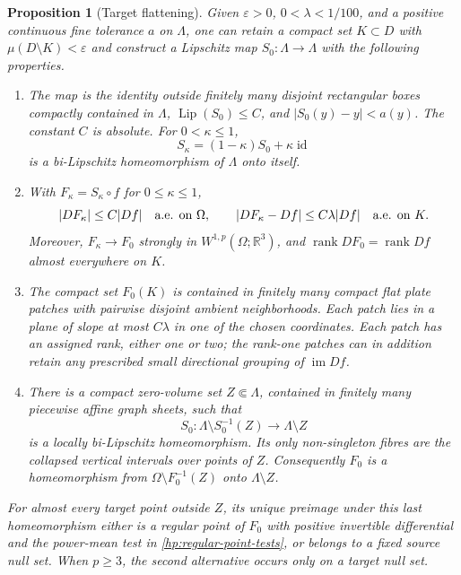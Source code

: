 \documentclass[11pt]{article}
\numberwithin{equation}{section}
\newtheorem{proposition}[theorem]{Proposition}
\theoremstyle{definition}
\theoremstyle{remark}
\begin{document}
\begin{proposition}[Target flattening]\label{hp:flattening}
Given $\varepsilon>0$, $0<\lambda<1/100$, and a positive continuous fine
tolerance $a$ on $\Lambda$, one can retain a compact set $K\subset D$
with $\mu(D\setminus K)<\varepsilon$ and construct a Lipschitz map
$S_0:\Lambda\to\Lambda$ with the following properties.
\begin{enumerate}
\item The map is the identity outside finitely many disjoint
rectangular boxes compactly contained in $\Lambda$,
$\operatorname{Lip}(S_0)\le C$, and $|S_0(y)-y|<a(y)$.  The constant $C$ is
absolute.  For $0<\kappa\le1$,
\[
 S_\kappa=(1-\kappa)S_0+\kappa\operatorname{id}
\]
is a bi-Lipschitz homeomorphism of $\Lambda$ onto itself.
\item With $F_\kappa=S_\kappa\circ f$ for $0\le\kappa\le1$,
\begin{equation}\label{hp:flattening-derivative}
 |DF_\kappa|\le C|Df|\quad\hbox{a.e. on }\Omega,
 \qquad
 |DF_\kappa-Df|\le C\lambda|Df|
                   \quad\hbox{a.e. on }K.
\end{equation}
Moreover, $F_\kappa\to F_0$ strongly in $W^{1,p}(\Omega;\mathbb R^3)$,
and $\operatorname{rank} DF_0=\operatorname{rank} Df$ almost everywhere on $K$.
\item The compact set $F_0(K)$ is contained in finitely many compact
flat plate patches with pairwise disjoint ambient neighborhoods.
Each patch lies in a plane of slope at most $C\lambda$ in one of
the chosen coordinates.  Each patch has an assigned rank, either
one or two; the rank-one patches can in addition retain any prescribed
small directional grouping of $\operatorname{im}Df$.
\item There is a compact zero-volume set $Z\Subset\Lambda$,
contained in finitely many piecewise affine graph sheets, such that
\begin{equation}\label{hp:flattening-homeomorphic-complement}
 S_0:\Lambda\setminus S_0^{-1}(Z)\longrightarrow\Lambda\setminus Z
\end{equation}
is a locally bi-Lipschitz homeomorphism.  Its only non-singleton
fibres are the collapsed vertical intervals over points of $Z$.
Consequently $F_0$ is a homeomorphism from
$\Omega\setminus F_0^{-1}(Z)$ onto $\Lambda\setminus Z$.
\end{enumerate}
For almost every target point outside $Z$, its unique preimage under
this last homeomorphism either is a regular point of $F_0$ with
positive invertible differential and the power-mean test in
\eqref{hp:regular-point-tests}, or belongs to a fixed source null set.
When $p\ge3$, the second alternative occurs only on a target null
set.
\end{proposition}
\end{document}
